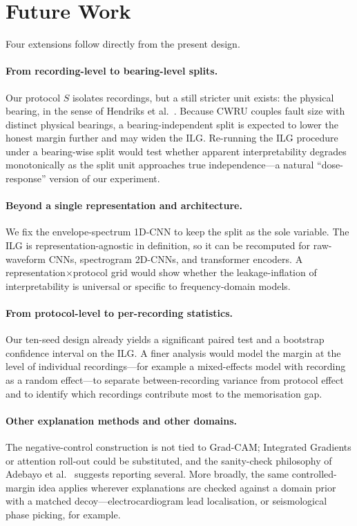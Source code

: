 \documentclass[11pt]{article}
\begin{document}
\section{Future Work}
Four extensions follow directly from the present design.

\paragraph{From recording-level to bearing-level splits.}
Our protocol $S$ isolates recordings, but a still stricter unit exists: the physical
bearing, in the sense of Hendriks et al.~\cite{hendriks2022benchmarking}. Because CWRU
couples fault size with distinct physical bearings, a bearing-independent split is expected
to lower the honest margin further and may widen the ILG. Re-running the ILG procedure
under a bearing-wise split would test whether apparent interpretability degrades
monotonically as the split unit approaches true independence---a natural ``dose-response''
version of our experiment.

\paragraph{Beyond a single representation and architecture.}
We fix the envelope-spectrum 1D-CNN to keep the split as the sole variable. The ILG is
representation-agnostic in definition, so it can be recomputed for raw-waveform CNNs,
spectrogram 2D-CNNs, and transformer encoders. A representation$\times$protocol grid would
show whether the leakage-inflation of interpretability is universal or specific to
frequency-domain models.

\paragraph{From protocol-level to per-recording statistics.}
Our ten-seed design already yields a significant paired test and a bootstrap confidence
interval on the ILG. A finer analysis would model the margin at the level of individual
recordings---for example a mixed-effects model with recording as a random effect---to
separate between-recording variance from protocol effect and to identify which recordings
contribute most to the memorisation gap.

\paragraph{Other explanation methods and other domains.}
The negative-control construction is not tied to Grad-CAM; Integrated Gradients or
attention roll-out could be substituted, and the sanity-check philosophy of
Adebayo et al.~\cite{adebayo2018sanity} suggests reporting several. More broadly, the same
controlled-margin idea applies wherever explanations are checked against a domain prior
with a matched decoy---electrocardiogram lead localisation, or seismological phase
picking, for example.
\end{document}
